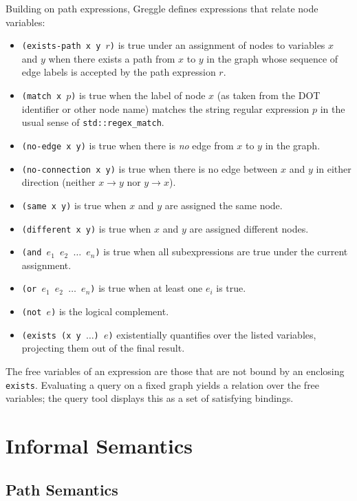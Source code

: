 \documentclass[11pt]{article}
\begin{document}
Building on path expressions, Greggle defines expressions that relate
node variables:
\begin{itemize}[leftmargin=*]
  \item \texttt{(exists-path x y $r$)} is true under an assignment of
        nodes to variables $x$ and $y$ when there exists a path from
        $x$ to $y$ in the graph whose sequence of edge labels is
        accepted by the path expression $r$.
  \item \texttt{(match x $p$)} is true when the label of node $x$
        (as taken from the DOT identifier or other node name) matches
        the string regular expression $p$ in the usual sense of
        \texttt{std::regex\_match}.
  \item \texttt{(no-edge x y)} is true when there is \emph{no} edge
        from $x$ to $y$ in the graph.
  \item \texttt{(no-connection x y)} is true when there is no edge
        between $x$ and $y$ in either direction (neither $x \to y$ nor
        $y \to x$).
  \item \texttt{(same x y)} is true when $x$ and $y$ are assigned the
        same node.
  \item \texttt{(different x y)} is true when $x$ and $y$ are assigned
        different nodes.
  \item \texttt{(and $e_1$ $e_2$ $\dots$ $e_n$)} is true when all
        subexpressions are true under the current assignment.
  \item \texttt{(or $e_1$ $e_2$ $\dots$ $e_n$)} is true when at least
        one $e_i$ is true.
  \item \texttt{(not $e$)} is the logical complement.
  \item \texttt{(exists (x y $\dots$) $e$)} existentially quantifies
        over the listed variables, projecting them out of the final
        result.
\end{itemize}

The free variables of an expression are those that are not bound by an
enclosing \texttt{exists}.  Evaluating a query on a fixed graph yields
a relation over the free variables; the query tool displays this as a
set of satisfying bindings.

\section{Informal Semantics}

\subsection{Path Semantics}
\end{document}
